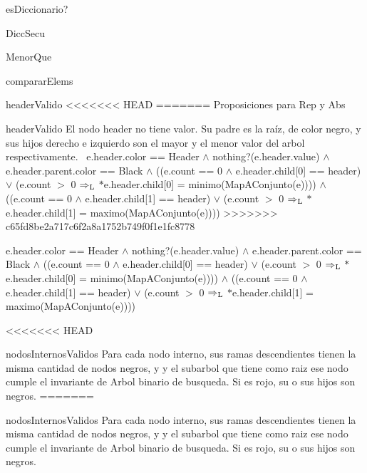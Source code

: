 \begin{DoxyParagraph}{es\-Diccionario?}
\begin{DoxyParagraph}{\-Dicc\-Secu}
\begin{DoxyParagraph}{\-Menor\-Que}
\begin{DoxyParagraph}{comparar\-Elems}
\begin{DoxyParagraph}{header\-Valido}
<<<<<<< HEAD
=======
Proposiciones para Rep y Abs

\begin{DoxyParagraph}{header\+Valido}
El nodo header no tiene valor. Su padre es la raíz, de color negro, y sus hijos derecho e izquierdo son el mayor y el menor valor del arbol respectivamente.~\newline
 e.\+header.\+color == Header $\land$ nothing?(e.\+header.\+value) $\land$ e.\+header.\+parent.\+color == Black $\land$ ((e.\+count == 0 $\land$ e.\+header.\+child\mbox{[}0\mbox{]} == header) $\lor$ (e.\+count $>$ 0 $\Rightarrow_{\rm L}$ $\ast$e.header.\+child\mbox{[}0\mbox{]} = minimo(\+Map\+A\+Conjunto(e)))) $\land$ ((e.\+count == 0 $\land$ e.\+header.\+child\mbox{[}1\mbox{]} == header) $\lor$ (e.\+count $>$ 0 $\Rightarrow_{\rm L}$ $\ast$e.header.\+child\mbox{[}1\mbox{]} = maximo(\+Map\+A\+Conjunto(e)))) 
>>>>>>> c65fd8be2a717c6f2a8a1752b749f0f1e1fc8778
\end{DoxyParagraph}
e.\-header.\-color == \-Header $\land$ nothing?(e.\-header.\-value) $\land$ e.\-header.\-parent.\-color == \-Black $\land$ ((e.\-count == 0 $\land$ e.\-header.\-child\mbox{[}0\mbox{]} == header) $\lor$ (e.\-count $>$ 0 $\Rightarrow_{\rm L}$ $\ast$e.header.\-child\mbox{[}0\mbox{]} = minimo(\-Map\-A\-Conjunto(e)))) $\land$ ((e.\-count == 0 $\land$ e.\-header.\-child\mbox{[}1\mbox{]} == header) $\lor$ (e.\-count $>$ 0 $\Rightarrow_{\rm L}$ $\ast$e.header.\-child\mbox{[}1\mbox{]} = maximo(\-Map\-A\-Conjunto(e)))) 

<<<<<<< HEAD
\begin{DoxyParagraph}{nodos\-Internos\-Validos}
\-Para cada nodo interno, sus ramas descendientes tienen la misma cantidad de nodos negros, y y el subarbol que tiene como raiz ese nodo cumple el invariante de \-Arbol binario de busqueda. \-Si es rojo, su o sus hijos son negros.
=======

\begin{DoxyParagraph}{nodos\+Internos\+Validos}
Para cada nodo interno, sus ramas descendientes tienen la misma cantidad de nodos negros, y y el subarbol que tiene como raiz ese nodo cumple el invariante de Arbol binario de busqueda. Si es rojo, su o sus hijos son negros.


\end{DoxyParagraph}
\end{DoxyParagraph}
\end{DoxyParagraph}
\end{DoxyParagraph}
\end{DoxyParagraph}
\end{DoxyParagraph}
\end{DoxyParagraph}
